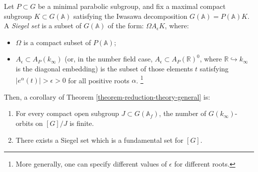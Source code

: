 \begin{definition}
 \label{definition-Siegel-set}
Let $P\subset G$ be a minimal parabolic subgroup, and fix a maximal compact subgroup $K\subset G(\mathbb A)$ satisfying the Iwasawa decomposition $G(\mathbb A)= P(\mathbb A) K$. A {\it Siegel set} is a subset of $G(\mathbb A)$ of the form: $\Omega A_\epsilon K$, where: 
\begin{itemize}
 \item $\Omega$ is a compact subset of $P(\mathbb A)$;
 \item $A_\epsilon\subset A_P(k_\infty)$ (or, in the number field case, $A_\epsilon\subset A_P(\mathbb R)^0$, where $\mathbb R\hookrightarrow k_\infty$ is the diagonal embedding) is the subset of those elements $t$ satisfying $|e^\alpha(t)|>\epsilon>0$ for all positive roots $\alpha$. \footnote{More generally, one can specify different values of $\epsilon$ for different roots.}
\end{itemize} 
\end{definition}

Then, a corollary of Theorem \ref{theorem-reduction-theory-general} is:

\begin{theorem}
\label{theorem-Siegel-finiteness}
\begin{enumerate}
 \item For every compact open subgroup $J\subset G(\mathbb A_f)$, the number of $G(k_\infty)$-orbits on $[G]/J$ is finite.
 \item There exists a Siegel set which is a fundamental set for $[G]$.
\end{enumerate}
\end{theorem}

